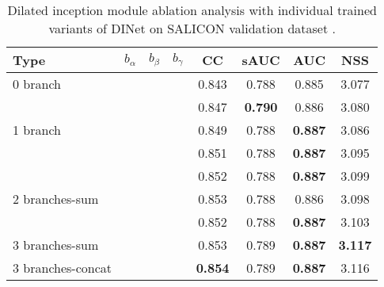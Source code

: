 \begin{table}[]
	\centering
	\scriptsize
	
	\caption{
Dilated inception module ablation analysis with individual trained variants of DINet on SALICON validation dataset \cite{jiang2015salicon}.
	} 
	\label{table:dimaa2}
	\begin{tabular}{|l|ccc|cccc|}
		\hline
		Type                            & $b_\alpha$ & $b_\beta$ &$b_\gamma$ & CC    & sAUC  & AUC   & NSS   \\ \hline
		0 branch                &    &    &    &  0.843  & 0.788 & 0.885 & 3.077 \\ \hline
		
		\multirow{3}{*}{1 branch}       & \checkmark   &    &    & 0.847 & \textbf{0.790}  & 0.886 & 3.080  \\ \cline{2-8} 
		&    & \checkmark   &    & 0.849 & 0.788 & \textbf{0.887} & 3.086 \\ \cline{2-8} 
		&    &    & \checkmark   & 0.851 & 0.788 & \textbf{0.887} & 3.095 \\ \hline
		\multirow{3}{*}{2 branches-sum} & \checkmark   & \checkmark   &    & 0.852 & 0.788 & \textbf{0.887} & 3.099 \\ \cline{2-8} 
		& \checkmark   &    & \checkmark   & 0.853 & 0.788 & 0.886 & 3.098 \\ \cline{2-8} 
		&    & \checkmark   & \checkmark   & 0.852 & 0.788 & \textbf{0.887} & 3.103 \\ \hline
		3 branches-sum                  & \checkmark   & \checkmark   & \checkmark   & 0.853 & 0.789 & \textbf{0.887} & \textbf{3.117} \\ \hline
		3 branches-concat               & \checkmark   & \checkmark   & \checkmark   & \textbf{0.854} & 0.789 & \textbf{0.887} & 3.116 \\ \hline 
\end{tabular}
\vspace{-4mm}
\end{table}



